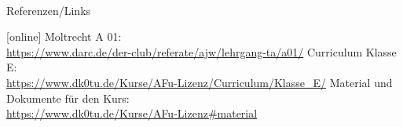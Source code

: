 \renewcommand{\refname}{Referenzen}

\hypertarget{refs}{}
\textcolor{white}{} \\ %
\Large Referenzen/Links
\footnotesize

\begin{thebibliography}{}
    [online]
   Moltrecht A 01: \\
    \url{https://www.darc.de/der-club/referate/ajw/lehrgang-ta/a01/}
    Curriculum Klasse E: \\
    \url{https://www.dk0tu.de/Kurse/AFu-Lizenz/Curriculum/Klasse_E/}
     Material und Dokumente für den Kurs: \\
    \url{https://www.dk0tu.de/Kurse/AFu-Lizenz#material}
\end{thebibliography}



